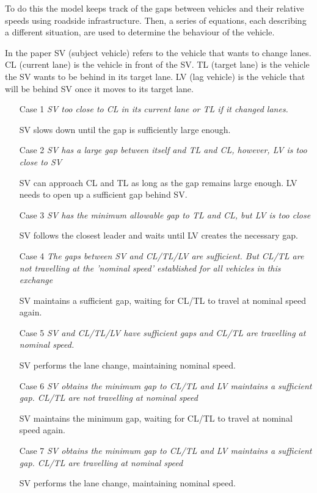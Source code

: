 To do this the model keeps track of the gaps between vehicles and their relative speeds using roadside infrastructure. Then, a series of equations, each describing a different situation, are used to determine the behaviour of the vehicle.

In the paper SV (subject vehicle) refers to the vehicle that wants to change lanes. CL (current lane) is the vehicle in front of the SV. TL (target lane) is the vehicle the SV wants to be behind in its target lane. LV (lag vehicle) is the vehicle that will be behind SV once it moves to its target  lane. 

\begin{enumerate}
\item[Case 1] \textit{SV too close to CL in its current lane or TL if it changed lanes.}

SV slows down until the gap is sufficiently large enough.
\item[Case 2] \textit{SV has a large gap between itself and TL and CL, however, LV is too close to SV}

SV can approach CL and TL as long as the gap remains large enough. LV needs to open up a sufficient gap behind SV.
\item[Case 3] \textit{SV has the minimum allowable gap to TL and CL, but LV is too close}

SV follows the closest leader and waits until LV creates the necessary gap.
\item[Case 4] \textit{The gaps between SV and CL/TL/LV are sufficient. But CL/TL are not travelling at the 'nominal speed' established for all vehicles in this exchange}

SV maintains a sufficient gap, waiting for CL/TL to travel at nominal speed again.
\item[Case 5] \textit{SV and CL/TL/LV have sufficient gaps and CL/TL are travelling at nominal speed.}

SV performs the lane change, maintaining nominal speed.
\item[Case 6] \textit{SV obtains the minimum gap to CL/TL and LV maintains a sufficient gap. CL/TL are not travelling at nominal speed}

SV maintains the minimum gap, waiting for CL/TL to travel at nominal speed again.
\item[Case 7] \textit{SV obtains the minimum gap to CL/TL and LV maintains a sufficient gap. CL/TL are travelling at nominal speed}

SV performs the lane change, maintaining nominal speed.
\end{enumerate}

